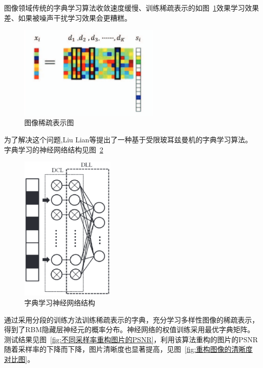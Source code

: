 \documentclass[12pt,a4paper,UTF8]{ctexart}
\begin{document}
图像领域传统的字典学习算法收敛速度缓慢、训练稀疏表示的如图~\ref{fig:图像稀疏表示图}效果学习效果差、如果被噪声干扰学习效果会更糟糕。
\begin{figure}[htpb]
     \centering
     \includegraphics[width=0.6\textwidth]{allpicture/图像稀疏表示图.eps}
     \caption{图像稀疏表示图}
     \label{fig:图像稀疏表示图}
\end{figure}
为了解决这个问题,Liu Lian等\cite{lianDictionaryLearningAlgorithm2021}提出了一种基于受限玻耳兹曼机的字典学习算法。
字典学习的神经网络结构见图~\ref{fig:字典学习神经网络结构}
\begin{figure}[htpb]
     \centering
     \includegraphics[width=0.4\textwidth]{allpicture/字典学习神经网络结构.eps}
     \caption{字典学习神经网络结构}
     \label{fig:字典学习神经网络结构}
\end{figure}
通过采用分段的训练方法训练稀疏表示的字典，充分学习多样性图像的稀疏表示，
得到了RBM隐藏层神经元的概率分布。神经网络的权值训练采用最优字典矩阵。
测试结果见图~\ref{fig:不同采样率重构图片的PSNR}，利用该算法重构的图片的PSNR随着采样率的下降而下降，图片清晰度也显著提高，见图~\ref{fig:重构图像的清晰度对比图}。
\end{document}
